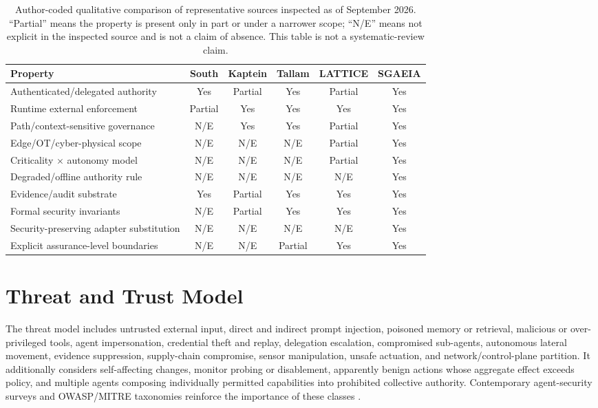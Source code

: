 \documentclass[11pt]{article}
\begin{document}
\begin{table}[t]
\centering
\small
\caption{Author-coded qualitative comparison of representative sources inspected as of September 2026. ``Partial'' means the property is present only in part or under a narrower scope; ``N/E'' means not explicit in the inspected source and is not a claim of absence. This table is not a systematic-review claim.}
\begin{tabularx}{\textwidth}{>{\raggedright\arraybackslash}Xccccc}
\toprule
Property & South & Kaptein & Tallam & LATTICE & SGAEIA \\
\midrule
Authenticated/delegated authority & Yes & Partial & Yes & Partial & Yes \\
Runtime external enforcement & Partial & Yes & Yes & Yes & Yes \\
Path/context-sensitive governance & N/E & Yes & Yes & Partial & Yes \\
Edge/OT/cyber-physical scope & N/E & N/E & N/E & Partial & Yes \\
Criticality $\times$ autonomy model & N/E & N/E & N/E & Partial & Yes \\
Degraded/offline authority rule & N/E & N/E & N/E & N/E & Yes \\
Evidence/audit substrate & Yes & Partial & Yes & Yes & Yes \\
Formal security invariants & N/E & Partial & Yes & Yes & Yes \\
Security-preserving adapter substitution & N/E & N/E & N/E & N/E & Yes \\
Explicit assurance-level boundaries & N/E & N/E & Partial & Yes & Yes \\
\bottomrule
\end{tabularx}
\end{table}

\section{Threat and Trust Model}
The threat model includes untrusted external input, direct and indirect prompt injection, poisoned memory or retrieval, malicious or over-privileged tools, agent impersonation, credential theft and replay, delegation escalation, compromised sub-agents, autonomous lateral movement, evidence suppression, supply-chain compromise, sensor manipulation, unsafe actuation, and network/control-plane partition. It additionally considers self-affecting changes, monitor probing or disablement, apparently benign actions whose aggregate effect exceeds policy, and multiple agents composing individually permitted capabilities into prohibited collective authority. Contemporary agent-security surveys and OWASP/MITRE taxonomies reinforce the importance of these classes \cite{chhabra2026agenticsecurity,tang2026agentsecurity,mitreatlas,owasp2026agentictop10}.
\end{document}
